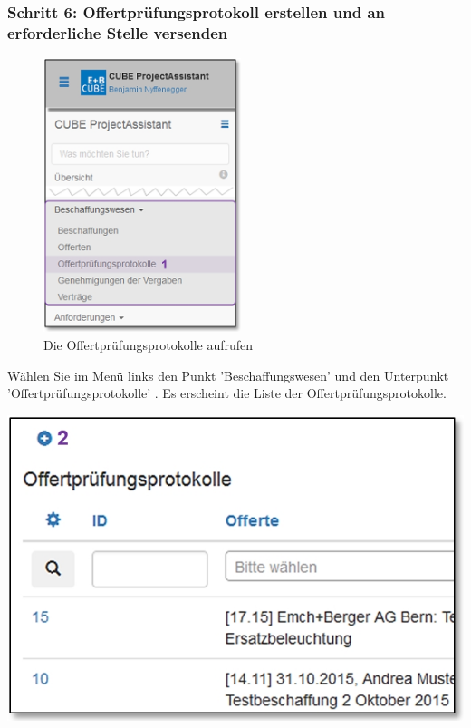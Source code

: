 \vspace{\baselineskip}

\pagebreak
\subsubsection{Schritt 6: Offertprüfungsprotokoll erstellen und an erforderliche Stelle versenden}

\begin{figure}
  \vspace{-30pt}      %
  \begin{center}
    \includegraphics[height=80mm]{../chapters/07_Beschaffungswesen/pictures/7-1-6_Menu_Besch_Offertp.jpg}
  \end{center}
  \vspace{-20pt}
  \caption{Die Offertprüfungsprotokolle aufrufen}
  \vspace{-10pt}
\end{figure}

Wählen Sie im Menü links den Punkt 'Beschaffungswesen' und den Unterpunkt 'Offertprüfungsprotokolle' . Es erscheint die Liste der Offertprüfungsprotokolle.

\begin{center}
\hspace{-15pt}   
\includegraphics[width=.75\linewidth]{../chapters/07_Beschaffungswesen/pictures/7-1-6_NeuesOffertPruefProtokoll.jpg}
\end{center}

